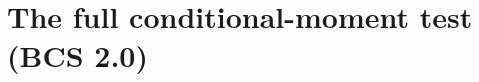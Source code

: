 \documentclass[aspectratio=169,10pt]{beamer}
\begin{document}
%
%
%
%
%


\section{The full conditional-moment test (BCS 2.0)}
\end{document}
